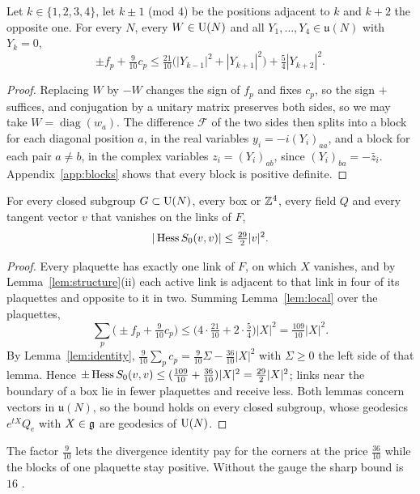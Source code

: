 \begin{lemma}\label{lem:local}
Let $k\in\{1,2,3,4\}$, let $k\pm1$ \textup{(}mod $4$\textup{)} be the
positions adjacent to $k$ and $k+2$ the opposite one. For every $N$, every
$W\in\mathrm{U}(N)$ and all $Y_1,\dots,Y_4\in\mathfrak u(N)$ with $Y_k=0$,
\[
\pm f_p+\tfrac9{10}c_p\le\tfrac{21}{10}\bigl(|Y_{k-1}|^2+|Y_{k+1}|^2\bigr)
+\tfrac54|Y_{k+2}|^2 .
\]
\end{lemma}

\begin{proof}
Replacing $W$ by $-W$ changes the sign of $f_p$ and fixes $c_p$, so the sign
$+$ suffices, and conjugation by a unitary matrix preserves both sides, so we
may take $W=\operatorname{diag}(w_a)$. The difference $\mathcal F$ of the two
sides then splits into a block for each diagonal position $a$, in the real
variables $y_i=-i(Y_i)_{aa}$, and a block for each pair $a\ne b$, in the
complex variables $z_i=(Y_i)_{ab}$, since $(Y_i)_{ba}=-\bar z_i$.
Appendix~\ref{app:blocks} shows that every block is positive definite.
\end{proof}

\begin{theorem}\label{thm:hess}
For every closed subgroup $G\subset\mathrm{U}(N)$, every box or $\mathbb{Z}^4$, every field
$Q$ and every tangent vector $v$ that vanishes on the links of $F$,
\[
|\operatorname{Hess} S_0(v,v)|\le\tfrac{29}2|v|^2 .
\]
\end{theorem}

\begin{proof}
Every plaquette has exactly one link of $F$, on which $X$ vanishes, and by
Lemma~\ref{lem:structure}(ii) each active link is adjacent to that link in
four of its plaquettes and opposite to it in two. Summing
Lemma~\ref{lem:local} over the plaquettes,
\[
\sum_p\bigl(\pm f_p+\tfrac9{10}c_p\bigr)\le\bigl(4\cdot\tfrac{21}{10}+2\cdot
\tfrac54\bigr)|X|^2=\tfrac{109}{10}|X|^2 .
\]
By Lemma~\ref{lem:identity}, $\frac9{10}\sum_pc_p=\frac9{10}\Sigma-\frac{36}{10}
|X|^2$ with $\Sigma\ge0$ the left side of that lemma. Hence $\pm\operatorname{Hess} S_0(v,v)
\le(\frac{109}{10}+\frac{36}{10})|X|^2=\frac{29}2|X|^2$; links near the boundary
of a box lie in fewer plaquettes and receive less. Both lemmas concern
vectors in $\mathfrak u(N)$, so the bound holds on every closed subgroup, whose
geodesics $e^{tX}Q_e$ with $X\in\mathfrak{g}$ are geodesics of $\mathrm{U}(N)$.
\end{proof}

The factor $\frac9{10}$ lets the divergence identity pay for the corners at
the price $\frac{36}{10}$ while the blocks of one plaquette stay positive.
Without the gauge the sharp bound is $16$ \cite{BB26a}.

